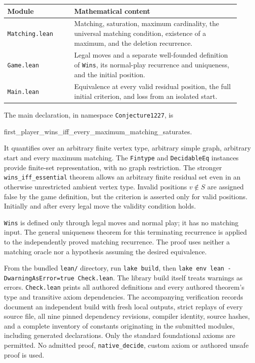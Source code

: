 \documentclass[10pt,letterpaper]{article}
\newcommand{\code}[1]{\texttt{\small #1}}
\begin{document}
\begin{center}\small
\begin{tabular}{@{}p{0.27\linewidth}p{0.67\linewidth}@{}}
\toprule
Module & Mathematical content \\
\midrule
\code{Matching.lean} & Matching, saturation, maximum cardinality, the universal
matching condition, existence of a maximum, and the deletion recurrence. \\
\code{Game.lean} & Legal moves and a separate well-founded definition of
\code{Wins}, its normal-play recurrence and uniqueness, and the initial position. \\
\code{Main.lean} & Equivalence at every valid residual position, the full initial
criterion, and loss from an isolated start. \\
\bottomrule
\end{tabular}
\end{center}

The main declaration, in namespace \code{Conjecture1227}, is
\begin{center}\small\ttfamily
first\_player\_wins\_iff\_every\_maximum\_matching\_saturates.
\end{center}
It quantifies over an arbitrary finite vertex type, arbitrary simple graph,
arbitrary start and every maximum matching. The \code{Fintype} and
\code{DecidableEq} instances provide finite-set representation, with no graph
restriction. The stronger \code{wins\_iff\_essential} theorem allows an arbitrary
finite residual set even in an otherwise unrestricted ambient vertex type.
Invalid positions $v\notin S$ are assigned false by the game definition, but
the criterion is asserted only for valid positions. Initially and after every
legal move the validity condition holds.

\code{Wins} is defined only through legal moves and normal play; it has no
matching input. The general uniqueness theorem for this terminating recurrence
is applied to the independently proved matching recurrence. The proof uses
neither a matching oracle nor a hypothesis assuming the desired equivalence.

From the bundled \code{lean/} directory, run \code{lake build}, then
\code{lake env lean -DwarningAsError=true Check.lean}. The library build itself
treats warnings as errors. \code{Check.lean} prints all authored definitions
and every authored theorem's type and transitive axiom dependencies.
The accompanying verification records document an independent build with fresh
local outputs, strict replays of every source file, all nine pinned dependency
revisions, compiler identity, source hashes, and a complete inventory of constants
originating in the submitted modules, including generated declarations.
Only the standard foundational axioms are permitted. No admitted proof,
\code{native\_decide}, custom axiom or authored unsafe proof is used.
\end{document}
